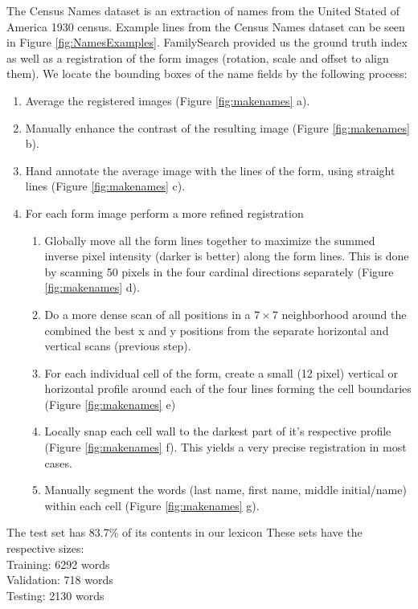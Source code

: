 \documentclass[ms,electronic,twosidetoc,letterpaper,chaptercenter,parttop,lof,lot]{byumsphd}
\begin{document}
The Census Names dataset is an extraction of names from the United Stated of America 1930 census. Example lines from the Census Names dataset can be seen in Figure \ref{fig:NamesExamples}. FamilySearch provided us the ground truth index as well as a  registration of the form images (rotation, scale and offset to align them). We locate the bounding boxes of the name fields by the following process:
\begin{enumerate}
 \item Average the registered images (Figure \ref{fig:makenames} a).
 \item Manually enhance the contrast of the resulting image (Figure \ref{fig:makenames} b). 
 \item Hand annotate the average image with the lines of the form, using straight lines (Figure \ref{fig:makenames} c). 
 \item For each form image perform a more refined registration %
 \begin{enumerate}
  \item Globally move all the form lines together to maximize the summed inverse pixel intensity (darker is better) along the form lines. This is done by scanning 50 pixels in the four cardinal directions separately (Figure \ref{fig:makenames} d). 
  \item Do a more dense scan of all positions in a $7\times 7$ neighborhood around the combined the best x and y positions from the separate horizontal and vertical scans (previous step). %
  \item For each individual cell of the form, create a small (12 pixel) vertical or horizontal profile  around each of the four lines forming the cell boundaries (Figure \ref{fig:makenames} e) 
  \item Locally snap each cell wall to the darkest part of it's respective profile (Figure \ref{fig:makenames} f). This yields a very precise registration in most cases. 
  \item Manually segment the words (last name, first name, middle initial/name) within each cell (Figure \ref{fig:makenames} g). 
 \end{enumerate}
\end{enumerate}
The test set has 83.7\% of its contents in our lexicon
These sets have the respective sizes:\\
\indent \indent Training: 6292 words\\
\indent \indent Validation: 718 words\\
\indent \indent Testing: 2130 words
\end{document}

